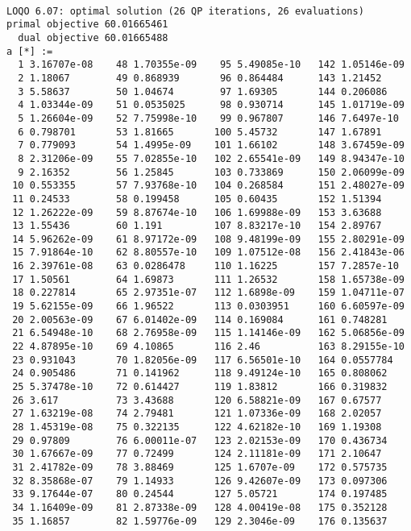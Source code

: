 \documentclass{article}
\begin{document}
\begin{verbatim}

LOQO 6.07: optimal solution (26 QP iterations, 26 evaluations)
primal objective 60.01665461
  dual objective 60.01665488
a [*] :=
  1 3.16707e-08    48 1.70355e-09    95 5.49085e-10   142 1.05146e-09
  2 1.18067        49 0.868939       96 0.864484      143 1.21452
  3 5.58637        50 1.04674        97 1.69305       144 0.206086
  4 1.03344e-09    51 0.0535025      98 0.930714      145 1.01719e-09
  5 1.26604e-09    52 7.75998e-10    99 0.967807      146 7.6497e-10
  6 0.798701       53 1.81665       100 5.45732       147 1.67891
  7 0.779093       54 1.4995e-09    101 1.66102       148 3.67459e-09
  8 2.31206e-09    55 7.02855e-10   102 2.65541e-09   149 8.94347e-10
  9 2.16352        56 1.25845       103 0.733869      150 2.06099e-09
 10 0.553355       57 7.93768e-10   104 0.268584      151 2.48027e-09
 11 0.24533        58 0.199458      105 0.60435       152 1.51394
 12 1.26222e-09    59 8.87674e-10   106 1.69988e-09   153 3.63688
 13 1.55436        60 1.191         107 8.83217e-10   154 2.89767
 14 5.96262e-09    61 8.97172e-09   108 9.48199e-09   155 2.80291e-09
 15 7.91864e-10    62 8.80557e-10   109 1.07512e-08   156 2.41843e-06
 16 2.39761e-08    63 0.0286478     110 1.16225       157 7.2857e-10
 17 1.50561        64 1.69873       111 1.26532       158 1.65738e-09
 18 0.227814       65 2.97351e-07   112 1.6898e-09    159 1.04711e-07
 19 5.62155e-09    66 1.96522       113 0.0303951     160 6.60597e-09
 20 2.00563e-09    67 6.01402e-09   114 0.169084      161 0.748281
 21 6.54948e-10    68 2.76958e-09   115 1.14146e-09   162 5.06856e-09
 22 4.87895e-10    69 4.10865       116 2.46          163 8.29155e-10
 23 0.931043       70 1.82056e-09   117 6.56501e-10   164 0.0557784
 24 0.905486       71 0.141962      118 9.49124e-10   165 0.808062
 25 5.37478e-10    72 0.614427      119 1.83812       166 0.319832
 26 3.617          73 3.43688       120 6.58821e-09   167 0.67577
 27 1.63219e-08    74 2.79481       121 1.07336e-09   168 2.02057
 28 1.45319e-08    75 0.322135      122 4.62182e-10   169 1.19308
 29 0.97809        76 6.00011e-07   123 2.02153e-09   170 0.436734
 30 1.67667e-09    77 0.72499       124 2.11181e-09   171 2.10647
 31 2.41782e-09    78 3.88469       125 1.6707e-09    172 0.575735
 32 8.35868e-07    79 1.14933       126 9.42607e-09   173 0.097306
 33 9.17644e-07    80 0.24544       127 5.05721       174 0.197485
 34 1.16409e-09    81 2.87338e-09   128 4.00419e-08   175 0.352128
 35 1.16857        82 1.59776e-09   129 2.3046e-09    176 0.135637

\end{verbatim}
\end{document}
